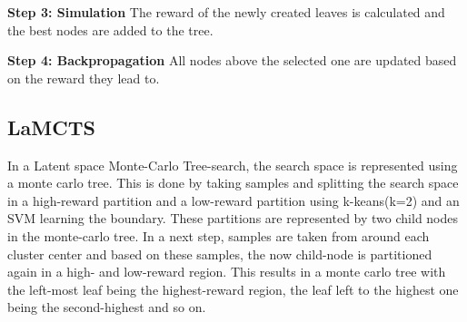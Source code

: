 \documentclass[bibliography=totoc]{scrartcl}
\begin{document}
\textbf{Step 3: Simulation} The reward of the newly created leaves is calculated and the best nodes are added to the tree.

\textbf{Step 4: Backpropagation} All nodes above the selected one are updated based on the reward they lead to.

\subsection{LaMCTS}
In a Latent space Monte-Carlo Tree-search, the search space is represented using a monte carlo tree. This is done by taking samples and splitting the search space in a high-reward partition and a low-reward partition using k-keans(k=2) and an SVM learning the boundary. These partitions are represented by two child nodes in the monte-carlo tree. In a next step, samples are taken from around each cluster center and based on these samples, the now child-node is partitioned again in a high- and low-reward region. This results in a monte carlo tree with the left-most leaf being the highest-reward region, the leaf left to the highest one being the second-highest and so on.
\end{document}
